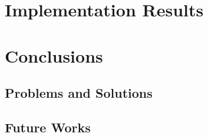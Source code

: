 \documentclass[12pt,oneside,openright,a4paper]{explo-english-project}
\begin{document}
\chapter{Implementation Results}


% 



\chapter{Conclusions}

\section{Problems and Solutions}


\section{Future Works}









\end{document}
